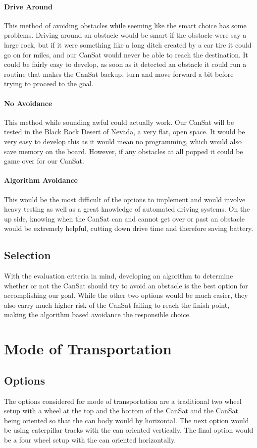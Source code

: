 \documentclass[10pt,letterpaper,onecolumn,journal]{IEEEtran}
\begin{document}
\paragraph{Drive Around}
This method of avoiding obstacles while seeming like the smart choice has some problems. Driving around an obstacle would be smart if the obstacle were say a large rock, but if it were something like a long ditch created by a car tire it could go on for miles, and our CanSat would never be able to reach the destination. It could be fairly easy to develop, as soon as it detected an obstacle it could run a routine that makes the CanSat backup, turn and move forward a bit before trying to proceed to the goal.
\paragraph{No Avoidance}
This method while sounding awful could actually work. Our CanSat will be tested in the Black Rock Desert of Nevada, a very flat, open space. It would be very easy to develop this as it would mean no programming, which would also save memory on the board. However, if any obstacles at all popped it could be game over for our CanSat.
\paragraph{Algorithm Avoidance}
This would be the most difficult of the options to implement and would involve heavy testing as well as a great knowledge of automated driving systems. On the up side, knowing when the CanSat can and cannot get over or past an obstacle would be extremely helpful, cutting down drive time and therefore saving battery.
\subsection{Selection}
With the evaluation criteria in mind, developing an algorithm to determine whether or not the CanSat should try to avoid an obstacle is the best option for accomplishing our goal. While the other two options would be much easier, they also carry much higher risk of the CanSat failing to reach the finish point, making the algorithm based avoidance the responsible choice.
\section{Mode of Transportation}
\subsection{Options}
The options considered for mode of transportation are a traditional two wheel setup with a wheel at the top and the bottom of the CanSat and the CanSat being oriented so that the can body would by horizontal. The next option would be using caterpillar tracks with the can oriented vertically. The final option would be a four wheel setup with the can oriented horizontally.
\end{document}
